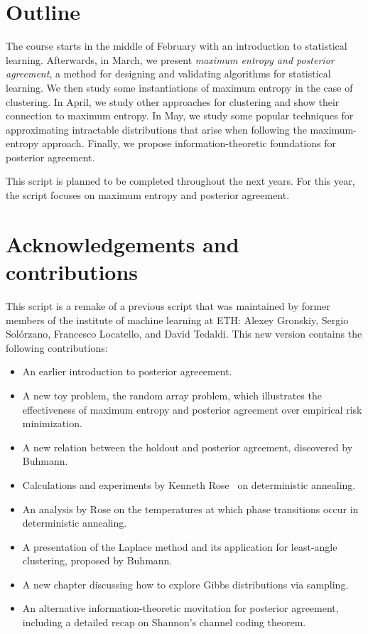 \section*{Outline}

The course starts in the middle of February with an introduction to statistical
learning. Afterwards, in March, we present \emph{maximum entropy and posterior agreement}, a method for designing and validating
algorithms for statistical learning. We then study some instantiations of maximum
entropy in the case of clustering. In April, we study other approaches
for clustering and show their connection to maximum entropy. In May, we
study some popular techniques for approximating intractable distributions that arise when following the maximum-entropy approach. Finally, we propose
information-theoretic foundations for posterior agreement.

This script is planned to be completed throughout the next years. For
this year, the script focuses on maximum entropy and posterior
agreement.

\section*{Acknowledgements and contributions}

This script is a remake of a previous script that was maintained by former
members of the institute of machine learning at ETH: Alexey Gronskiy,
Sergio Sol\'orzano, Francesco Locatello, and David Tedaldi. This new version
contains the following contributions:

\begin{itemize}
\item An earlier introduction to posterior agreeement.
\item A new toy problem, the random array problem, which illustrates
the effectiveness of maximum entropy and posterior agreement over
empirical risk minimization.
\item A new relation between the holdout and posterior agreement, discovered
by Buhmann.
\item Calculations and experiments by Kenneth Rose~\cite{rose1991deterministic, rose1998deterministic} on deterministic
annealing.
\item An analysis by Rose on the temperatures at which phase transitions
occur in deterministic annealing.
\item A presentation of the Laplace method and its application for least-angle
clustering, proposed by Buhmann.
\item A new chapter discussing how to explore Gibbs distributions via sampling.
\item An alternative information-theoretic movitation for posterior agreement,
including a detailed recap on Shannon's channel coding theorem.
\end{itemize}

